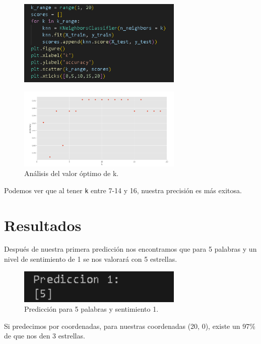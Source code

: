 \documentclass{article}
\begin{document}
\begin{figure}[H]
    \centering
    \includegraphics[width=0.7\textwidth]{img/21.png}
\end{figure}

\begin{figure}[H]
    \centering
    \includegraphics[width=0.7\textwidth]{img/22.png}
    \caption{Análisis del valor óptimo de k.}
\end{figure}

Podemos ver que al tener \texttt{k} entre 7-14 y 16, nuestra precisión es más exitosa.

\section{Resultados}
Después de nuestra primera predicción nos encontramos que para 5 palabras y un nivel de sentimiento de 1 se nos valorará con 5 estrellas.

\begin{figure}[H]
    \centering
    \includegraphics[width=0.7\textwidth]{img/23.png}
    \caption{Predicción para 5 palabras y sentimiento 1.}
\end{figure}

Si predecimos por coordenadas, para nuestras coordenadas (20, 0), existe un 97\% de que nos den 3 estrellas.
\end{document}
